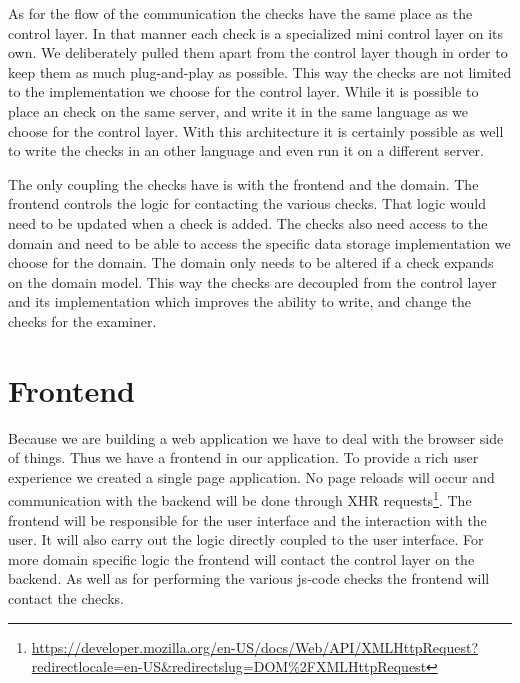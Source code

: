 As for the flow of the communication
the \glspl{check} have the same place as the control layer.
In that manner each \gls{check} is a specialized mini control layer on its own.
We deliberately pulled them apart from the control layer though
in order to keep them as much plug-and-play as possible.
This way the \glspl{check} are not limited
to the implementation we choose for the control layer.
While it is possible to place an \gls{check} on the same server,
and write it in the same language as we choose for the control layer.
With this architecture it is certainly possible as well
to write the \glspl{check} in an other language
and even run it on a different server.

The only coupling the \glspl{check} have is with the frontend and the domain.
The frontend controls the logic for contacting the various \glspl{check}.
That logic would need to be updated when a \gls{check} is added.
The \glspl{check} also need access to the domain
and need to be able to access
the specific data storage implementation we choose for the domain.
The domain only needs to be altered if a \gls{check} expands on the domain model.
This way the \glspl{check} are decoupled from the control layer
and its implementation which improves the ability to write, and change
the \glspl{check} for the \gls{examiner}.

\section{Frontend}
Because we are building a web application
we have to deal with the browser side of things.
Thus we have a frontend in our application.
To provide a rich user experience we created a single page application.
No page reloads will occur
and communication with the backend will be done through
XHR requests\footnote{\url{https://developer.mozilla.org/en-US/docs/Web/API/XMLHttpRequest?redirectlocale=en-US&redirectslug=DOM\%2FXMLHttpRequest}}.
The frontend will be responsible for the user interface
and the interaction with the user.
It will also carry out the logic directly coupled to the user interface.
For more domain specific logic
the frontend will contact the control layer on the backend.
As well as for performing the various \gls{js-code} \glspl{check}
the frontend will contact the \glspl{check}.

